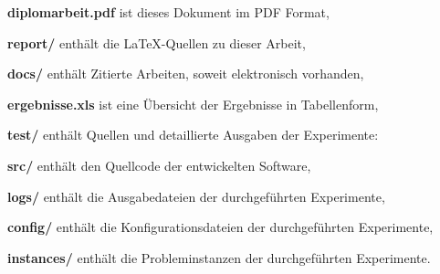 \begin{description}
	\item \textbf{diplomarbeit.pdf} ist dieses Dokument im PDF Format,
	\item \textbf{report/} enthält die \LaTeX-Quellen zu dieser Arbeit,
	\item \textbf{docs/} enthält Zitierte Arbeiten, soweit elektronisch vorhanden,
	\item \textbf{ergebnisse.xls} ist eine Übersicht der Ergebnisse in Tabellenform,
	\item \textbf{test/} enthält Quellen und detaillierte Ausgaben der Experimente:
	\begin{description}
		\item \textbf{src/} enthält den Quellcode der entwickelten Software,
		\item \textbf{logs/} enthält die Ausgabedateien der durchgeführten Experimente,
		\item \textbf{config/} enthält die Konfigurationsdateien der durchgeführten Experimente,
		\item \textbf{instances/} enthält die Probleminstanzen der durchgeführten Experimente.
	\end{description}
\end{description}